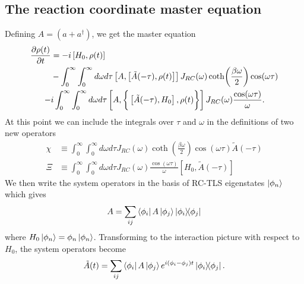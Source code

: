 \documentclass[]{article}
\begin{document}
\subsection{The reaction coordinate master equation}
Defining $A= (a + a^{\dagger})$, we get the master equation
\begin{align}
	\begin{split}
		\label{eq:ReactionMasterExpansion4}
		\pdv{\rho(t)}{t} &= -i\left[H_0, \rho(t)\right]\\
		&-\int_{0}^{\infty}\int_{0}^{\infty}d\omega d\tau 
		\left[A,\left[\tilde{A}(-\tau),\rho(t) \right]\right] J_{RC}(\omega) \coth(\frac{\beta \omega}{2})\cos(\omega \tau)\\ 
		-& i\int_{0}^{\infty}\int_{0}^{\infty}d\omega d\tau\left[A ,\biggr\lbrace\left[\tilde{A}(-\tau),H_0\right],\rho(t) \biggr\rbrace \right] J_{RC}(\omega) \frac{\cos(\omega \tau)}{\omega}.
	\end{split}
\end{align}
At this point we can include the integrals over $\tau$ and $\omega$ in the definitions of two new operators
\begin{align}
	\label{eq:NewRCOperators}
	\chi &\equiv \int_{0}^{\infty}\int_{0}^{\infty}d\omega d\tau  J_{RC}(\omega) \coth(\frac{\beta \omega}{2})\cos(\omega \tau) \tilde{A}(-\tau)\\
	\Xi &\equiv \int_{0}^{\infty}\int_{0}^{\infty}d\omega d\tau  J_{RC}(\omega) \frac{\cos(\omega\tau)}{\omega} \left[H_0, \tilde{A}(-\tau)\right]
\end{align}
We then write the system operators in the basis of RC-TLS eigenstates $\ket{\phi_n}$ which gives
\begin{equation}
A = \sum_{ij}\bra{\phi_i}A\ket{\phi_j} \dyad{\phi_i}{\phi_j}
\end{equation}
where $H_0\ket{\phi_n} = \phi_n\ket{\phi_n}$. Transforming to the interaction picture with respect to $H_0$, the system operators become
\begin{equation}
\tilde{A}(t) = \sum_{ij}\bra{\phi_i}A\ket{\phi_j} e^{i(\phi_i-\phi_j)t}\dyad{\phi_i}{\phi_j}.
\end{equation}
\end{document}
